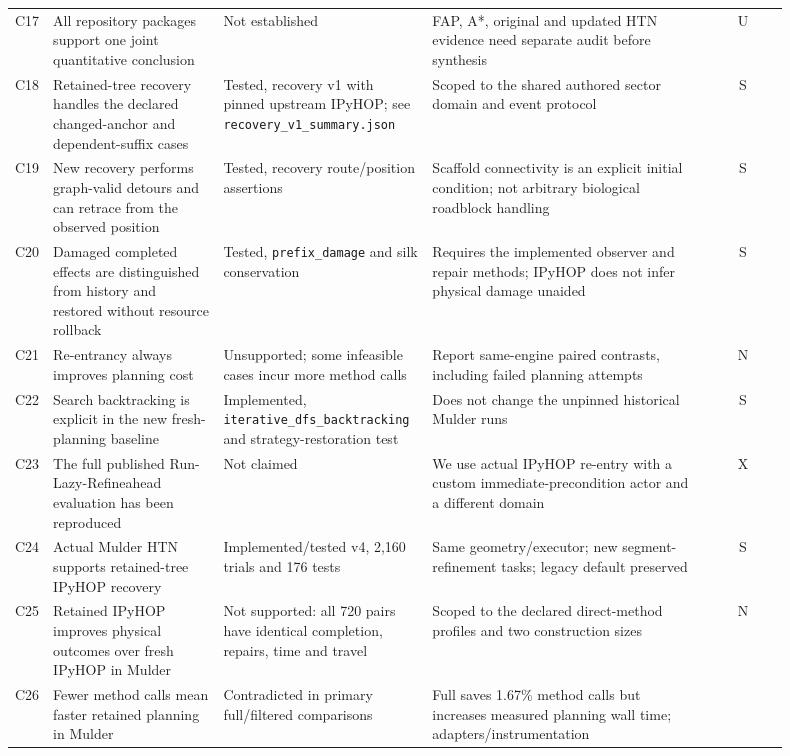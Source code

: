 {\begin{longtable}{@{}p{0.045\linewidth}p{0.22\linewidth}p{0.27\linewidth}p{0.36\linewidth}c@{}}
C17 & All repository packages support one joint quantitative conclusion & Not established & FAP, A*, original and
  updated HTN evidence need separate audit before synthesis & U \\
C18 & Retained-tree recovery handles the declared changed-anchor and dependent-suffix cases & Tested, recovery v1
  with pinned upstream IPyHOP; see \texttt{recovery\_\allowbreak{}v1\_\allowbreak{}summary.json} & Scoped to the shared authored sector domain
  and event protocol & S \\
C19 & New recovery performs graph-valid detours and can retrace from the observed position & Tested, recovery
  route/position assertions & Scaffold connectivity is an explicit initial condition; not arbitrary biological
  roadblock handling & S \\
C20 & Damaged completed effects are distinguished from history and restored without resource rollback & Tested,
  \texttt{prefix\_damage} and silk conservation & Requires the implemented observer and repair methods; IPyHOP does
  not infer physical damage unaided & S \\
C21 & Re-entrancy always improves planning cost & Unsupported; some infeasible cases incur more method calls &
  Report same-engine paired contrasts, including failed planning attempts & N \\
C22 & Search backtracking is explicit in the new fresh-planning baseline & Implemented,
  \texttt{iterative\_\allowbreak{}dfs\_\allowbreak{}backtracking} and strategy-restoration test & Does not change the unpinned historical
  Mulder runs & S \\
C23 & The full published Run-Lazy-Refineahead evaluation has been reproduced & Not claimed & We use actual IPyHOP
  re-entry with a custom immediate-precondition actor and a different domain & X \\
C24 & Actual Mulder HTN supports retained-tree IPyHOP recovery & Implemented/tested v4, 2,160 trials and 176 tests
  & Same geometry/executor; new segment-refinement tasks; legacy default preserved & S \\
C25 & Retained IPyHOP improves physical outcomes over fresh IPyHOP in Mulder & Not supported: all 720 pairs have
  identical completion, repairs, time and travel & Scoped to the declared direct-method profiles and two
  construction sizes & N \\
C26 & Fewer method calls mean faster retained planning in Mulder & Contradicted in primary full/filtered
  comparisons & Full saves 1.67\% method calls but increases measured planning wall time; adapters/instrumentation

\end{longtable}}
